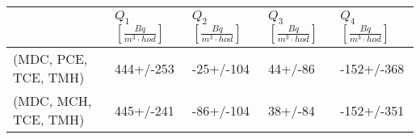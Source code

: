 \begin{tabular}{lllll}
\toprule
{} & $Q_1$ $\left[\si{\frac{Bq}{m^3\cdot hod}}\right]$ & $Q_2$ $\left[\si{\frac{Bq}{m^3\cdot hod}}\right]$ & $Q_3$ $\left[\si{\frac{Bq}{m^3\cdot hod}}\right]$ & $Q_4$ $\left[\si{\frac{Bq}{m^3\cdot hod}}\right]$ \\
\midrule
(MDC, PCE, TCE, TMH) & 444+/-253 & -25+/-104 & 44+/-86 & -152+/-368 \\
(MDC, MCH, TCE, TMH) & 445+/-241 & -86+/-104 & 38+/-84 & -152+/-351 \\
\bottomrule
\end{tabular}
